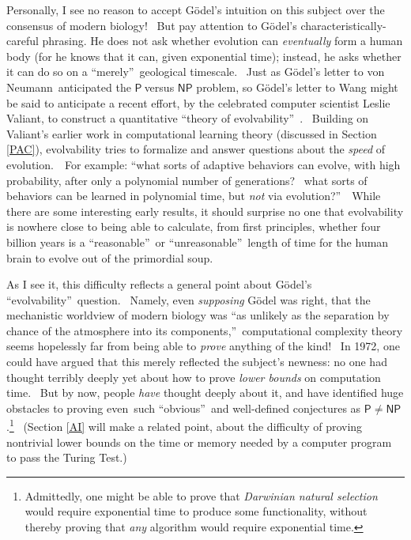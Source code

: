 \documentclass[11pt,onecolumn]{article}%
\begin{document}
Personally, I see no reason to accept G\"{o}del's intuition on this subject
over the consensus of modern biology! \ But pay attention to G\"{o}del's
characteristically-careful phrasing. He does not ask whether evolution can
\textit{eventually} form a human body (for he knows that it can, given
exponential time); instead, he asks whether it can do so on a
\textquotedblleft merely\textquotedblright\ geological\textit{ }timescale.
\ Just as G\"{o}del's letter to von Neumann\ anticipated the $\mathsf{P}%
\ $versus $\mathsf{NP}$ problem, so G\"{o}del's letter to Wang might be said
to anticipate a recent effort, by the celebrated computer scientist Leslie
Valiant, to construct a quantitative \textquotedblleft theory of
evolvability\textquotedblright\ \cite{valiant:evol}. \ Building on Valiant's
earlier work in computational learning theory (discussed in Section
\ref{PAC}), evolvability tries to formalize and answer questions about the
\textit{speed} of evolution.\ \ For example: \textquotedblleft what sorts of
adaptive behaviors can evolve, with high probability, after only a polynomial
number of generations? \ what sorts of behaviors can be learned in polynomial
time, but \textit{not} via evolution?\textquotedblright\ \ While there are
some interesting early results, it should surprise no one that evolvability is
nowhere close to being able to calculate, from first principles, whether four
billion years is a \textquotedblleft reasonable\textquotedblright\ or
\textquotedblleft unreasonable\textquotedblright\ length of time for the human
brain to evolve out of the primordial soup.

As I see it, this difficulty reflects a general point about G\"{o}del's
\textquotedblleft evolvability\textquotedblright\ question. \ Namely, even
\textit{supposing} G\"{o}del was right, that the mechanistic worldview of
modern biology was \textquotedblleft as unlikely as the separation by chance
of the atmosphere into its components,\textquotedblright\ computational
complexity theory seems hopelessly far from being able to \textit{prove}
anything of the kind! \ In 1972, one could have argued that this merely
reflected the subject's newness: no one had thought terribly deeply yet about
how to prove \textit{lower bounds} on computation time. \ But by now, people
\textit{have} thought deeply about it, and have identified huge obstacles to
proving even\ such \textquotedblleft obvious\textquotedblright\ and
well-defined conjectures as $\mathsf{P}\neq\mathsf{NP}$.\footnote{Admittedly,
one might be able to prove that \textit{Darwinian natural selection} would
require exponential time to produce some functionality, without thereby
proving that \textit{any} algorithm would require exponential time.}
\ (Section \ref{AI} will make a related point, about the difficulty of proving
nontrivial lower bounds on the time or memory needed by a computer program to
pass the Turing Test.)
\end{document}
